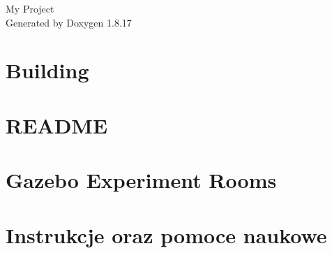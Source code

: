 \let\mypdfximage\pdfximage\def\pdfximage{\immediate\mypdfximage}\documentclass[twoside]{book}
\newcommand{\+}{\discretionary{\mbox{\scriptsize$\hookleftarrow$}}{}{}}
\newcommand{\clearemptydoublepage}{%
  \newpage{\pagestyle{empty}\cleardoublepage}%
}
\begin{document}
\hypersetup{pageanchor=false,
             bookmarksnumbered=true,
             pdfencoding=unicode
            }
\begin{titlepage}
\vspace*{7cm}
\begin{center}%
{\Large My Project }\\
\vspace*{1cm}
{\large Generated by Doxygen 1.8.17}\\
\end{center}
\end{titlepage}
\clearemptydoublepage
{}
\tableofcontents
\clearemptydoublepage
{}
\hypersetup{pageanchor=true}

\chapter{Building}
\label{md__home_patryk__pulpit_zad5_2-_patidzon__r_e_a_d_m_e}

\chapter{R\+E\+A\+D\+ME}
\label{md__home_patryk__pulpit_zad5_2-_patidzon_tests_bin_queue_8pyi_models_piston_rod_part_ariac__r_e_a_d_m_e}

\chapter{Gazebo Experiment Rooms}
\label{md__home_patryk__pulpit_zad5_2-_patidzon_tests_doctest_extensions_synchronize_8pyi__r_e_a_d_m_e}

\chapter{Instrukcje oraz pomoce naukowe}
\label{md__home_patryk__pulpit_zad5_2-_patidzon_tests_doctest_translation_8pyi_social-tracking-protecti5535cc22a8a55dd8129c55589fe26e89}

\end{document}
